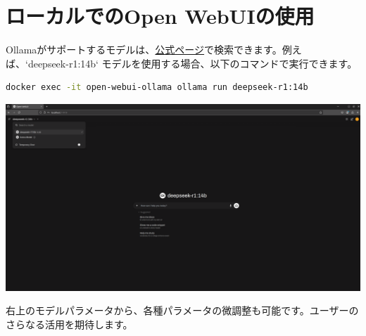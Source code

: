 \section{ローカルでのOpen WebUIの使用}
Ollamaがサポートするモデルは、\href{https://ollama.com/search}{公式ページ}で検索できます。例えば、`deepseek-r1:14b` モデルを使用する場合、以下のコマンドで実行できます。
\begin{lstlisting}[language=bash]
docker exec -it open-webui-ollama ollama run deepseek-r1:14b
\end{lstlisting}

\includegraphics[width=0.8\linewidth]{images/Pasted image 20250304170628.png}

右上のモデルパラメータから、各種パラメータの微調整も可能です。ユーザーのさらなる活用を期待します。